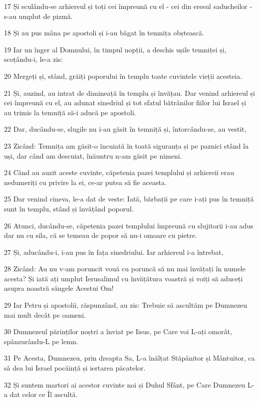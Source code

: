 \par 17 Și sculându-se arhiereul și toți cei împreună cu el - cei din eresul saducheilor - s-au umplut de pizmă.
\par 18 Și au pus mâna pe apostoli și i-au băgat în temnița obștească.
\par 19 Iar un înger al Domnului, în timpul nopții, a deschis ușile temniței și, scoțându-i, le-a zis:
\par 20 Mergeți și, stând, grăiți poporului în templu toate cuvintele vieții acesteia.
\par 21 Și, auzind, au intrat de dimineață în templu și învățau. Dar venind arhiereul și cei împreună cu el, au adunat sinedriul și tot sfatul bătrânilor fiilor lui Israel și au trimis la temniță să-i aducă pe apostoli.
\par 22 Dar, ducându-se, slugile nu i-au găsit în temniță și, întorcându-se, au vestit,
\par 23 Zicând: Temnița am găsit-o încuiată în toată siguranța și pe paznici stând la uși, dar când am descuiat, înăuntru n-am găsit pe nimeni.
\par 24 Când au auzit aceste cuvinte, căpetenia pazei templului și arhiereii erau nedumeriți cu privire la ei, ce-ar putea să fie aceasta.
\par 25 Dar venind cineva, le-a dat de veste: Iată, bărbații pe care i-ați pus în temniță sunt în templu, stând și învățând poporul.
\par 26 Atunci, ducându-se, căpetenia pazei templului împreună cu slujitorii i-au adus dar nu cu sila, că se temeau de popor să nu-i omoare cu pietre.
\par 27 Și, aducându-i, i-au pus în fața sinedriului. Iar arhiereul i-a întrebat,
\par 28 Zicând: Au nu v-am poruncit vouă cu poruncă să nu mai învățați în numele acesta? Și iată ați umplut Ierusalimul cu învățătura voastră și voiți să aduceți asupra noastră sângele Acestui Om!
\par 29 Iar Petru și apostolii, răspunzând, au zis: Trebuie să ascultăm pe Dumnezeu mai mult decât pe oameni.
\par 30 Dumnezeul părinților noștri a înviat pe Iisus, pe Care voi L-ați omorât, spânzurându-L pe lemn.
\par 31 Pe Acesta, Dumnezeu, prin dreapta Sa, L-a înălțat Stăpânitor și Mântuitor, ca să dea lui Israel pocăință și iertarea păcatelor.
\par 32 Și suntem martori ai acestor cuvinte noi și Duhul Sfânt, pe Care Dumnezeu L-a dat celor ce Îl ascultă.
